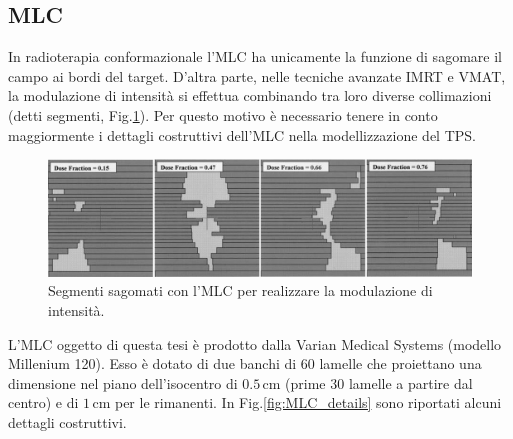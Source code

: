\subsection{MLC}
In radioterapia conformazionale l'MLC ha unicamente la funzione di sagomare il campo ai bordi del target. D'altra parte, nelle tecniche avanzate IMRT e VMAT, la modulazione di intensità si effettua combinando tra loro diverse collimazioni (detti segmenti, Fig.\ref{fig:IMRT_Segments}). Per questo motivo è necessario tenere in conto maggiormente i dettagli costruttivi dell'MLC nella modellizzazione del TPS.

\begin{figure}
\centering
\includegraphics[width=\textwidth]{./cap2/IMRT_Segments_2.jpg}
\caption{Segmenti sagomati con l'MLC per realizzare la modulazione di intensità.}
\label{fig:IMRT_Segments}
\end{figure}

L'MLC oggetto di questa tesi è prodotto dalla Varian Medical Systems (modello Millenium 120). Esso è dotato di due banchi di 60 lamelle che proiettano una dimensione nel piano dell'isocentro di $0.5\,$cm (prime 30 lamelle a partire dal centro) e di $1\,$cm per le rimanenti. In Fig.\ref{fig:MLC_details} sono riportati alcuni dettagli costruttivi.

